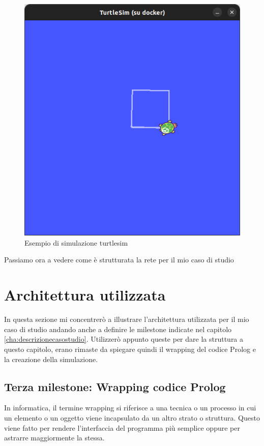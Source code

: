 \begin{figure}[h!]
    \centering
    \includegraphics[scale=0.4]{images/turtlesimes.png}
    \caption{Esempio di simulazione turtlesim}
    \label{fig:turtlesimes}
\end{figure}

Passiamo ora a vedere come è strutturata la rete per il mio caso di studio
\section{Architettura utilizzata}
\label{sec:architettura_utilizzata}
In questa sezione mi concentrerò a illustrare l'architettura utilizzata per il mio caso di studio andando anche a definire le milestone indicate nel capitolo \ref{cha:descrizionecasostudio}.
Utilizzerò appunto queste per dare la struttura a questo capitolo, erano rimaste da spiegare quindi il wrapping del codice Prolog e la creazione della simulazione.

\subsection{Terza milestone: Wrapping codice Prolog}
\label{subsec:wrappping}
In informatica, il termine wrapping si riferisce a una tecnica o un processo in cui un elemento o un oggetto viene incapsulato da un altro strato o struttura.
Questo viene fatto per rendere l'interfaccia del programma più semplice oppure per astrarre maggiormente la stessa. 

